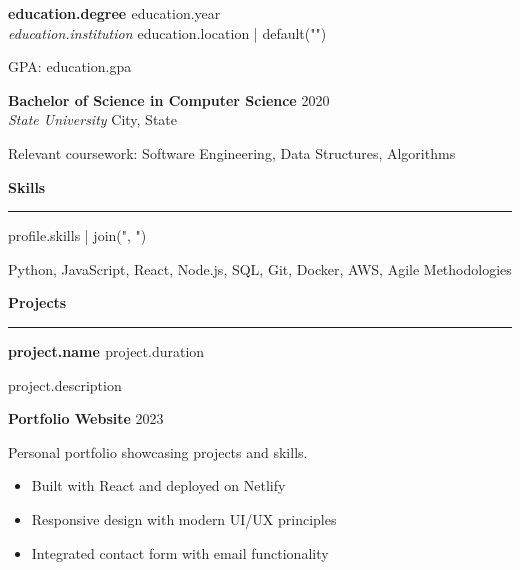 \documentclass[letterpaper,11pt]{article}
\newcommand{\sectionheader}[1]{
    \vspace{0.8em}
    {\large\textbf{#1}}
    \vspace{0.3em}
    \hrule
    \vspace{0.5em}
}
\newcommand{\workentry}[4]{
    \textbf{#1} \hfill #2 \\
    \textit{#3} \hfill #4
}
\begin{document}
{{{{{{{{{{%
\workentry{ {{ education.degree }} }{ {{ education.year }} }{ {{ education.institution }} }{ {{ education.location | default("") }} }

{%
GPA: {{ education.gpa }}
{%

\vspace{0.3em}
{%

{%
\workentry{Bachelor of Science in Computer Science}{2020}{State University}{City, State}

Relevant coursework: Software Engineering, Data Structures, Algorithms

\vspace{0.3em}
{%

{%

{%
\sectionheader{Skills}

{%
{{ profile.skills | join(", ") }}
{%
Python, JavaScript, React, Node.js, SQL, Git, Docker, AWS, Agile Methodologies
{%

{%

{%
\sectionheader{Projects}

{%
\textbf{ {{ project.name }} } \hfill {{ project.duration }}

{{ project.description }}


\vspace{0.3em}
{%

{%
\textbf{Portfolio Website} \hfill 2023

Personal portfolio showcasing projects and skills.

\begin{itemize}[leftmargin=1em, itemsep=0.2em, topsep=0.3em]
    \item Built with React and deployed on Netlify
    \item Responsive design with modern UI/UX principles
    \item Integrated contact form with email functionality
\end{itemize}

}}}}}}}}}}}}}}}}}}}}}}}}}
\end{document}
